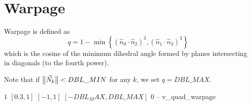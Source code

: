 \section{Warpage}

Warpage is defined as
\[
q =
  1 - \min \left\{
    \left( \hat n_0 \cdot \hat n_2  \right)^3,
    \left( \hat n_1 \cdot \hat n_3  \right)^3
  \right\}
\]
which is the cosine of the minimum dihedral angle formed by
planes intersecting in diagonals (to the fourth power).

Note that if $\big\lVert{\vec N_k}\big\rVert < DBL\_MIN$ for any $k$, we set $q = DBL\_MAX$.

%
{$1$}%
{$[0.3,1]$}%
{$[-1,1]$}%
{$[-DBL_MAX,DBL\_MAX]$}%
{$0$}%
{--}%
{v\_quad\_warpage}%


